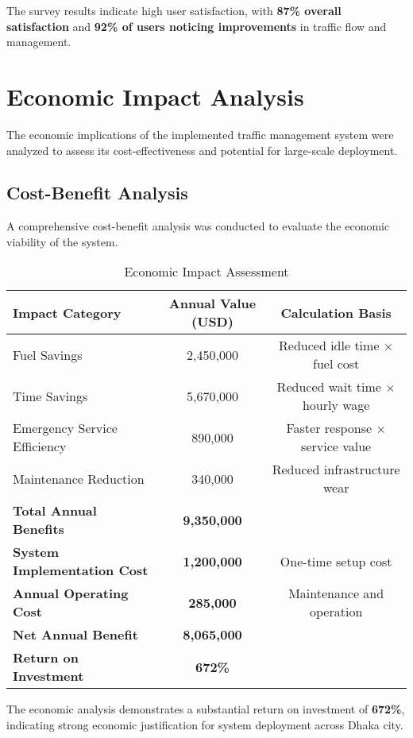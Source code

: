 The survey results indicate high user satisfaction, with \textbf{87\% overall satisfaction} and \textbf{92\% of users noticing improvements} in traffic flow and management.

\section{Economic Impact Analysis}
\label{sec:economic_impact}

The economic implications of the implemented traffic management system were analyzed to assess its cost-effectiveness and potential for large-scale deployment.

\subsection{Cost-Benefit Analysis}
A comprehensive cost-benefit analysis was conducted to evaluate the economic viability of the system.

\begin{table}[h]
\centering
\caption{Economic Impact Assessment}
\label{tab:economic_impact}
\begin{tabular}{|l|c|c|}
\hline
\textbf{Impact Category} & \textbf{Annual Value (USD)} & \textbf{Calculation Basis} \\
\hline
Fuel Savings & 2,450,000 & Reduced idle time × fuel cost \\
Time Savings & 5,670,000 & Reduced wait time × hourly wage \\
Emergency Service Efficiency & 890,000 & Faster response × service value \\
Maintenance Reduction & 340,000 & Reduced infrastructure wear \\
\hline
\textbf{Total Annual Benefits} & \textbf{9,350,000} & \\
\hline
\textbf{System Implementation Cost} & \textbf{1,200,000} & One-time setup cost \\
\textbf{Annual Operating Cost} & \textbf{285,000} & Maintenance and operation \\
\hline
\textbf{Net Annual Benefit} & \textbf{8,065,000} & \\
\textbf{Return on Investment} & \textbf{672\%} & \\
\hline
\end{tabular}
\end{table}

The economic analysis demonstrates a substantial return on investment of \textbf{672\%}, indicating strong economic justification for system deployment across Dhaka city.

